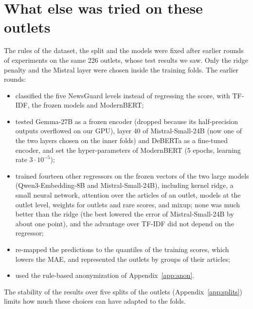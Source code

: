 \documentclass[11pt,a4paper]{article}
\begin{document}
\section{What else was tried on these outlets}\label{app:tried}
The rules of the dataset, the split and the models were fixed after earlier rounds of experiments on the same 226
outlets, whose test results we saw. Only the ridge penalty and the Mistral layer were chosen inside the training folds.
The earlier rounds:
\begin{itemize}
  \item classified the five NewsGuard levels instead of regressing the score, with TF-IDF, the frozen models and
        ModernBERT;
  \item tested Gemma-27B as a frozen encoder (dropped because its half-precision outputs overflowed on our GPU), layer 40
        of Mistral-Small-24B (now one of the two layers chosen on the inner folds) and DeBERTa as a fine-tuned encoder,
        and set the hyper-parameters of ModernBERT (5 epochs, learning rate $3 \cdot 10^{-5}$);
  \item trained fourteen other regressors on the frozen vectors of the two large models (Qwen3-Embedding-8B and
        Mistral-Small-24B), including
        kernel ridge, a small neural network, attention over the articles of an outlet, models at the outlet level,
        weights for outlets and rare scores, and mixup; none was much better than the ridge (the best lowered the error
        of Mistral-Small-24B by about one point), and the advantage over TF-IDF did not depend on the regressor;
  \item re-mapped the predictions to the quantiles of the training scores, which lowers the MAE, and represented the
        outlets by groups of their articles;
  \item used the rule-based anonymization of Appendix~\ref{app:anon}.
\end{itemize}
The stability of the results over five splits of the outlets (Appendix~\ref{app:splits}) limits how much these choices
can have adapted to the folds.



\end{document}

